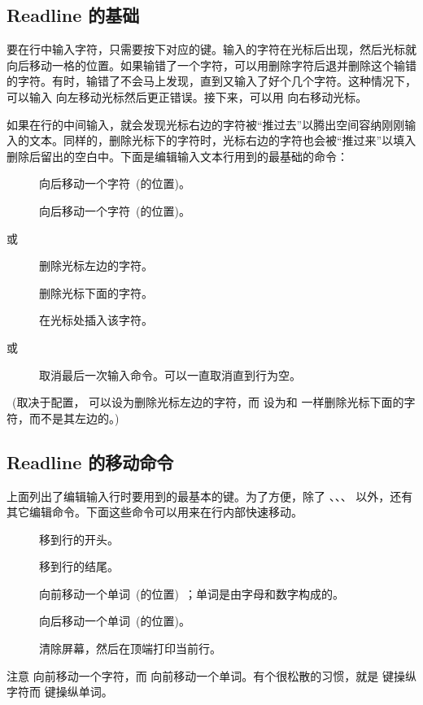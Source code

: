 \documentclass[openany,notitlepage]{book}
\begin{document}
\begin{CJK}{UTF8}{song}
\subsection{Readline 的基础} %
要在行中输入字符，只需要按下对应的键。输入的字符在光标后出现，然后光标就向后移动一格的位置。如果输错了一个字符，可以用删除字符后退并删除这个输错的字符。有时，输错了不会马上发现，直到又输入了好个几个字符。这种情况下，可以输入  向左移动光标然后更正错误。接下来，可以用  向右移动光标。

如果在行的中间输入，就会发现光标右边的字符被``推过去''以腾出空间容纳刚刚输入的文本。同样的，删除光标下的字符时，光标右边的字符也会被``推过来''以填入删除后留出的空白中。下面是编辑输入文本行用到的最基础的命令：
\begin{description}
    \item[] 向后移动一个字符~(的位置)。
    \item[] 向后移动一个字符~(的位置)。
    \item[ 或 ] 删除光标左边的字符。
    \item[] 删除光标下面的字符。
    \item[] 在光标处插入该字符。
    \item[ 或  ] 取消最后一次输入命令。可以一直取消直到行为空。
\end{description}
~(取决于配置， 可以设为删除光标左边的字符，而  设为和  一样删除光标下面的字符，而不是其左边的。)~

\subsection{Readline 的移动命令} %
上面列出了编辑输入行时要用到的最基本的键。为了方便，除了 、、、 以外，还有其它编辑命令。下面这些命令可以用来在行内部快速移动。
\begin{description}
    \item[] 移到行的开头。
    \item[] 移到行的结尾。
    \item[] 向前移动一个单词~(的位置)~；单词是由字母和数字构成的。
    \item[] 向后移动一个单词~(的位置)。
    \item[] 清除屏幕，然后在顶端打印当前行。
\end{description}
注意  向前移动一个字符，而  向前移动一个单词。有个很松散的习惯，就是  键操纵字符而  键操纵单词。


\end{CJK}
\end{document}
